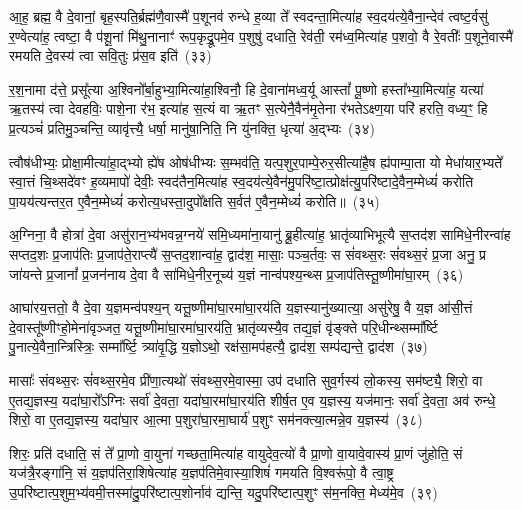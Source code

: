आ॒ह॒ ब्रह्म॒ वै दे॒वानां॒ बृह॒स्पति॒र्ब्रह्म॑णै॒वास्मै॑ प॒शूनव॑ रुन्धे ह॒व्या ते᳚ स्वदन्ता॒मित्या॑ह स्व॒दय॑त्ये॒वैना॒न्देव॑ त्वष्ट॒र्वसु॑ र॒ण्वेत्या॑ह॒ त्वष्टा॒ वै प॑शू॒नां मि॑थु॒नानाꣳ॑ रूप॒कृद्रू॒पमे॒व प॒शुषु॑ दधाति॒ रेव॑ती॒ रम॑ध्व॒मित्या॑ह प॒शवो॒ वै रे॒वतीः᳚ प॒शूने॒वास्मै॑ रमयति दे॒वस्य॑ त्वा सवि॒तुः प्र॑स॒व इति॑~(३३)

र॒श॒नामा द॑त्ते॒ प्रसू᳚त्या अ॒श्विनो᳚र्बा॒हुभ्या॒मित्या॑हा॒श्विनौ॒ हि दे॒वाना॑मध्व॒र्यू आस्तां᳚ पू॒ष्णो हस्ता᳚भ्या॒मित्या॑ह॒ यत्या॑ ऋ॒तस्य॑ त्वा देवहविः॒ पाशे॒ना र॑भ॒ इत्या॑ह स॒त्यं वा ऋ॒तꣳ स॒त्येनै॒वैन॑मृ॒तेना र॑भते\-ऽक्ष्ण॒या परि॑ हरति॒ वध्य॒ꣳ॒ हि प्र॒त्यञ्चं॑ प्रतिमु॒ञ्चन्ति॒ व्यावृ॑त्त्यै॒ धर्\mbox{}षा॒ मानु॑षा॒निति॒ नि यु॑नक्ति॒ धृत्या॑ अ॒द्भ्यः~(३४)

त्वौष॑धीभ्यः॒ प्रोक्षा॒मीत्या॑हा॒द्भ्यो ह्ये॑ष ओष॑धीभ्यः स॒म्भव॑ति॒ यत्प॒शुर॒पाम्पे॒रुर॒सीत्या॑है॒ष ह्य॑पाम्पा॒ता यो मेधा॑यार॒भ्यते᳚ स्वा॒त्तं चि॒थ्सदे॑वꣳ ह॒व्यमापो॑ देवीः॒ स्वद॑तैन॒मित्या॑ह स्व॒दय॑त्ये॒वैन॑मु॒परि॑ष्टा॒त्प्रोक्ष॑त्यु॒परि॑ष्टादे॒वैन॒म्मेध्यं॑ करोति पा॒यय॑त्यन्तर॒त ए॒वैन॒म्मेध्यं॑ करोत्य॒धस्ता॒दुपो᳚क्षति स॒र्वत॑ ए॒वैन॒म्मेध्यं॑ करोति॥~(३५)

{\anuvakamend[{वसू॒निति॑ प्रस॒व इत्य॒द्भ्यो᳚\-ऽन्तर॒त ए॒वैन॒न्दश॑ च}]}%

अ॒ग्निना॒ वै होत्रा॑ दे॒वा असु॑रान॒भ्य॑भवन्न॒ग्नये॑ समि॒ध्यमा॑ना॒यानु॑ ब्रू॒हीत्या॑ह॒ भ्रातृ॑व्याभिभूत्यै स॒प्तद॑श सामिधे॒नीरन्वा॑ह सप्तद॒शः प्र॒जा\-प॑तिः प्र॒जाप॑ते॒राप्त्यै॑ स॒प्तद॒शान्वा॑ह॒ द्वाद॑श॒ मासाः॒ पञ्च॒र्तवः॒ स सं॑वथ्स॒रः सं॑वथ्स॒रं प्र॒जा अनु॒ प्र जा॑यन्ते प्र॒जानां᳚ प्र॒जन॑नाय दे॒वा वै सा॑मिधे॒नीर॒नूच्य॑ य॒ज्ञं नान्व॑पश्य॒न्थ्स प्र॒जा\-प॑तिस्तू॒ष्णीमा॑घा॒रम्~(३६)

आघा॑रय॒त्ततो॒ वै दे॒वा य॒ज्ञमन्व॑पश्य॒न् यत्तू॒ष्णीमा॑घा॒रमा॑घा॒रय॑ति य॒ज्ञस्यानु॑ख्यात्या॒ असु॑रेषु॒ वै य॒ज्ञ आ॑सी॒त्तं दे॒वास्तू᳚ष्णीꣳहो॒मेना॑वृञ्जत॒ यत्तू॒ष्णीमा॑घा॒रमा॑घा॒रय॑ति॒ भ्रातृ॑व्यस्यै॒व तद्य॒ज्ञं वृ॑ङ्क्ते परि॒धीन्थ्सम्मा᳚र्ष्टि पु॒नात्ये॒वैना॒न्त्रिस्त्रिः॒ सम्मा᳚र्ष्टि॒ त्र्या॑वृ॒द्धि य॒ज्ञो\-ऽथो॒ रक्ष॑सा॒मप॑हत्यै॒ द्वाद॑श॒ सम्प॑द्यन्ते॒ द्वाद॑श~(३७)

मासाः᳚ संवथ्स॒रः सं॑वथ्स॒रमे॒व प्री॑णा॒त्यथो॑ संवथ्स॒रमे॒वास्मा॒ उप॑ दधाति सुव॒र्गस्य॑ लो॒कस्य॒ सम॑ष्ट्यै॒ शिरो॒ वा ए॒तद्य॒ज्ञस्य॒ यदा॑घा॒रो᳚\-ऽग्निः सर्वा॑ दे॒वता॒ यदा॑घा॒रमा॑घा॒रय॑ति शीर्\mbox{}ष॒त ए॒व य॒ज्ञस्य॒ यज॑मानः॒ सर्वा॑ दे॒वता॒ अव॑ रुन्धे॒ शिरो॒ वा ए॒तद्य॒ज्ञस्य॒ यदा॑घा॒र आ॒त्मा प॒शुरा॑घा॒रमा॒घार्य॑ प॒शुꣳ सम॑नक्त्या॒त्मन्ने॒व य॒ज्ञस्य॑~(३८)

शिरः॒ प्रति॑ दधाति॒ सं ते᳚ प्रा॒णो वा॒युना॑ गच्छता॒मित्या॑ह वायुदेव॒त्यो॑ वै प्रा॒णो वा॒यावे॒वास्य॑ प्रा॒णं जु॑होति॒ सं यज॑त्रै॒रङ्गा॑नि॒ सं य॒ज्ञप॑तिरा॒शिषेत्या॑ह य॒ज्ञप॑तिमे॒वास्या॒शिषं॑ गमयति वि॒श्वरू॑पो॒ वै त्वा॒ष्ट्र उ॒परि॑ष्टात्प॒शुम॒भ्य॑वमी॒त्तस्मा॑दु॒परि॑ष्टात्प॒शोर्नाव॑ द्यन्ति॒ यदु॒परि॑ष्टात्प॒शुꣳ स॑म॒नक्ति॒ मेध्य॑मे॒व~(३९)

